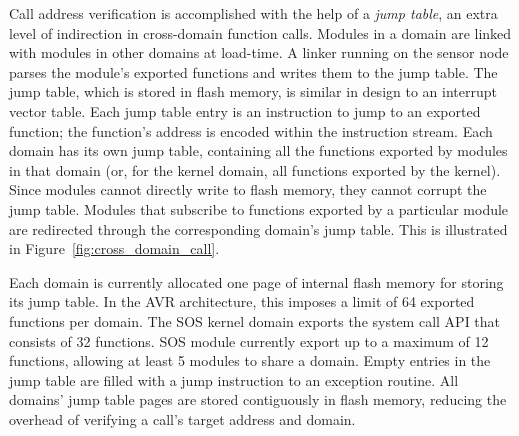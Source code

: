 %
Call address verification is accomplished with the help of a \emph{jump
table}, an extra level of indirection in cross-domain function calls.
%
%
Modules in a domain are linked with modules in other domains at
load-time.%
%
A linker running on the sensor node parses the module's exported functions
and writes them to the jump table.
%
The jump table, which is stored in flash memory, is similar in design
to an interrupt vector table.
%
Each jump table entry is an instruction to jump to an exported
function;
%
the function's address is encoded within the instruction stream.
%
Each domain has its own jump table, containing all the functions exported
by modules in that domain (or, for the kernel domain, all functions
exported by the kernel).
%
Since modules cannot directly write to flash memory, they cannot
corrupt the jump table.
%
Modules that subscribe to functions exported by a particular module
are redirected through the corresponding domain's jump table.
%
This is illustrated in Figure~\ref{fig:cross_domain_call}.
%
%

Each domain is currently allocated one page of internal flash memory for
storing its jump table.
%
%
In the AVR architecture, this imposes a limit of 64 exported functions per
domain.
%
The SOS kernel domain exports the system call API that consists of 32
functions.
%
SOS module currently export up to a maximum of 12 functions, allowing
at least 5 modules to share a domain.
%
Empty entries in the jump table are filled with a jump instruction to an
exception routine.
%
All domains' jump table pages are stored contiguously in flash memory,
reducing the overhead of verifying a call's target address and domain.




